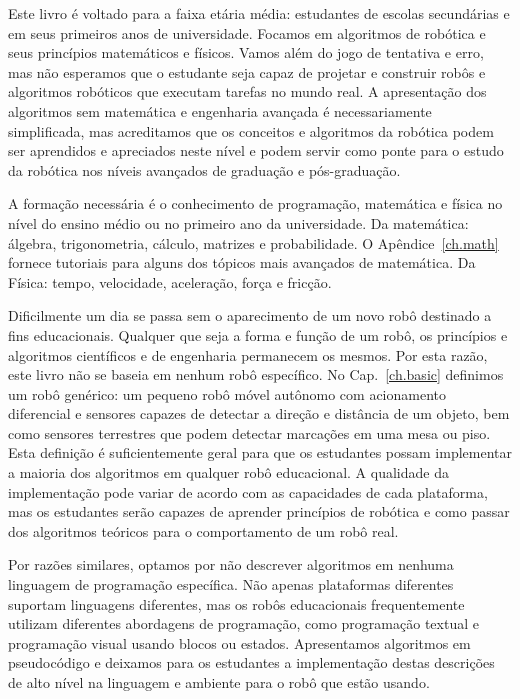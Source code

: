 Este livro é voltado para a faixa etária média: estudantes de escolas secundárias e em seus primeiros anos de universidade. Focamos em algoritmos de robótica e seus princípios matemáticos e físicos. Vamos além do jogo de tentativa e erro, mas não esperamos que o estudante seja capaz de projetar e construir robôs e algoritmos robóticos que executam tarefas no mundo real. A apresentação dos algoritmos sem matemática e engenharia avançada é necessariamente simplificada, mas acreditamos que os conceitos e algoritmos da robótica podem ser aprendidos e apreciados neste nível e podem servir como ponte para o estudo da robótica nos níveis avançados de graduação e pós-graduação.

A formação necessária é o conhecimento de programação, matemática e física no nível do ensino médio ou no primeiro ano da universidade. Da matemática: álgebra, trigonometria, cálculo, matrizes e probabilidade. O Apêndice~\ref{ch.math} fornece tutoriais para alguns dos tópicos mais avançados de matemática. Da Física: tempo, velocidade, aceleração, força e fricção.

Dificilmente um dia se passa sem o aparecimento de um novo robô destinado a fins educacionais. Qualquer que seja a forma e função de um robô, os princípios e algoritmos científicos e de engenharia permanecem os mesmos. Por esta razão, este livro não se baseia em nenhum robô específico. No Cap.~\ref{ch.basic} definimos um robô genérico: um pequeno robô móvel autônomo com acionamento diferencial e sensores capazes de detectar a direção e distância de um objeto, bem como sensores terrestres que podem detectar marcações em uma mesa ou piso. Esta definição é suficientemente geral para que os estudantes possam implementar a maioria dos algoritmos em qualquer robô educacional. A qualidade da implementação pode variar de acordo com as capacidades de cada plataforma, mas os estudantes serão capazes de aprender princípios de robótica e como passar dos algoritmos teóricos para o comportamento de um robô real.

Por razões similares, optamos por não descrever algoritmos em nenhuma linguagem de programação específica. Não apenas plataformas diferentes suportam linguagens diferentes, mas os robôs educacionais frequentemente utilizam diferentes abordagens de programação, como programação textual e programação visual usando blocos ou estados. Apresentamos algoritmos em pseudocódigo e deixamos para os estudantes a implementação destas descrições de alto nível na linguagem e ambiente para o robô que estão usando.

